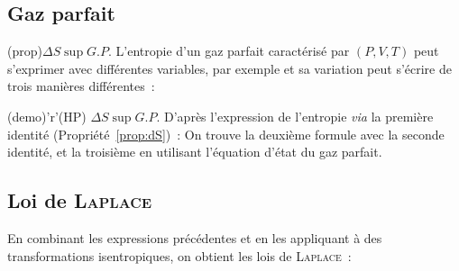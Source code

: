 \documentclass[../../main/main.tex]{subfiles}
\begin{document}
\vspace{-15pt}
\subsection{Gaz parfait}
\begin{tcbraster}[raster equal height=rows, raster columns=2]
	\begin{tcb*}(prop){$\Delta{S}\sup{G.P.}$}
		L'entropie d'un gaz parfait caractérisé par $(P,V,T)$ peut s'exprimer avec
		différentes variables, par exemple
		\psw{%
			\[
				S(T,V) =
				C_V \ln (\frac{T}{T\ind{ref}}) + nR \ln (\frac{V}{V\ind{ref}}) +
				S\ind{ref}
			\]
		}%
		et sa variation peut s'écrire de trois manières différentes~:
		\vspace{-15pt}
	\end{tcb*}
	\begin{tcb}(demo)'r'{(HP) $\Delta{S}\sup{G.P.}$}
		D'après l'expression de l'entropie \textit{via} la première identité
		(Propriété~\ref{prop:dS})~:
		On trouve la deuxième formule avec la seconde identité, et la troisième en
		utilisant l'équation d'état du gaz parfait.
	\end{tcb}
\end{tcbraster}

\subsection{Loi de \textsc{Laplace}}
En combinant les expressions précédentes et en les appliquant à des
transformations isentropiques, on obtient les lois de \textsc{Laplace}~:
\end{document}
